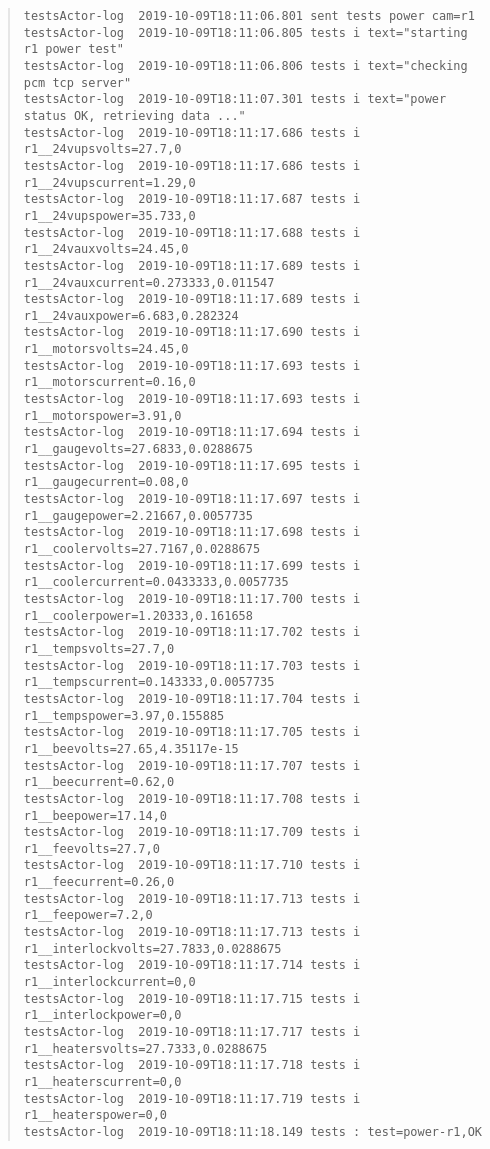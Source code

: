 \begin{quote}
\begin{tiny}
\begin{verbatim}
testsActor-log  2019-10-09T18:11:06.801 sent tests power cam=r1
testsActor-log  2019-10-09T18:11:06.805 tests i text="starting r1 power test"
testsActor-log  2019-10-09T18:11:06.806 tests i text="checking pcm tcp server"
testsActor-log  2019-10-09T18:11:07.301 tests i text="power status OK, retrieving data ..."
testsActor-log  2019-10-09T18:11:17.686 tests i r1__24vupsvolts=27.7,0
testsActor-log  2019-10-09T18:11:17.686 tests i r1__24vupscurrent=1.29,0
testsActor-log  2019-10-09T18:11:17.687 tests i r1__24vupspower=35.733,0
testsActor-log  2019-10-09T18:11:17.688 tests i r1__24vauxvolts=24.45,0
testsActor-log  2019-10-09T18:11:17.689 tests i r1__24vauxcurrent=0.273333,0.011547
testsActor-log  2019-10-09T18:11:17.689 tests i r1__24vauxpower=6.683,0.282324
testsActor-log  2019-10-09T18:11:17.690 tests i r1__motorsvolts=24.45,0
testsActor-log  2019-10-09T18:11:17.693 tests i r1__motorscurrent=0.16,0
testsActor-log  2019-10-09T18:11:17.693 tests i r1__motorspower=3.91,0
testsActor-log  2019-10-09T18:11:17.694 tests i r1__gaugevolts=27.6833,0.0288675
testsActor-log  2019-10-09T18:11:17.695 tests i r1__gaugecurrent=0.08,0
testsActor-log  2019-10-09T18:11:17.697 tests i r1__gaugepower=2.21667,0.0057735
testsActor-log  2019-10-09T18:11:17.698 tests i r1__coolervolts=27.7167,0.0288675
testsActor-log  2019-10-09T18:11:17.699 tests i r1__coolercurrent=0.0433333,0.0057735
testsActor-log  2019-10-09T18:11:17.700 tests i r1__coolerpower=1.20333,0.161658
testsActor-log  2019-10-09T18:11:17.702 tests i r1__tempsvolts=27.7,0
testsActor-log  2019-10-09T18:11:17.703 tests i r1__tempscurrent=0.143333,0.0057735
testsActor-log  2019-10-09T18:11:17.704 tests i r1__tempspower=3.97,0.155885
testsActor-log  2019-10-09T18:11:17.705 tests i r1__beevolts=27.65,4.35117e-15
testsActor-log  2019-10-09T18:11:17.707 tests i r1__beecurrent=0.62,0
testsActor-log  2019-10-09T18:11:17.708 tests i r1__beepower=17.14,0
testsActor-log  2019-10-09T18:11:17.709 tests i r1__feevolts=27.7,0
testsActor-log  2019-10-09T18:11:17.710 tests i r1__feecurrent=0.26,0
testsActor-log  2019-10-09T18:11:17.713 tests i r1__feepower=7.2,0
testsActor-log  2019-10-09T18:11:17.713 tests i r1__interlockvolts=27.7833,0.0288675
testsActor-log  2019-10-09T18:11:17.714 tests i r1__interlockcurrent=0,0
testsActor-log  2019-10-09T18:11:17.715 tests i r1__interlockpower=0,0
testsActor-log  2019-10-09T18:11:17.717 tests i r1__heatersvolts=27.7333,0.0288675
testsActor-log  2019-10-09T18:11:17.718 tests i r1__heaterscurrent=0,0
testsActor-log  2019-10-09T18:11:17.719 tests i r1__heaterspower=0,0
testsActor-log  2019-10-09T18:11:18.149 tests : test=power-r1,OK
\end{verbatim}
\end{tiny}
\end{quote}

